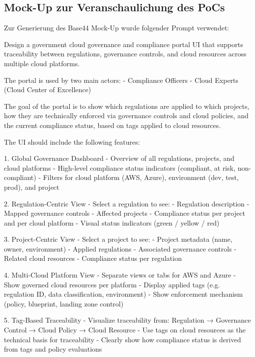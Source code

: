 \begin{appendix}

\section{Mock-Up zur Veranschaulichung des PoCs}
\label{appendix:ui-mockup}
Zur Generierung des Base44 Mock-Up wurde folgender Prompt verwendet:

Design a government cloud governance and compliance portal UI that supports traceability between regulations, governance controls, and cloud resources across multiple cloud platforms.

The portal is used by two main actors:
- Compliance Officers
- Cloud Experts (Cloud Center of Excellence)

The goal of the portal is to show which regulations are applied to which projects, how they are technically enforced via governance controls and cloud policies, and the current compliance status, based on tags applied to cloud resources.

The UI should include the following features:

1. Global Governance Dashboard
- Overview of all regulations, projects, and cloud platforms
- High-level compliance status indicators (compliant, at risk, non-compliant)
- Filters for cloud platform (AWS, Azure), environment (dev, test, prod), and project

2. Regulation-Centric View
- Select a regulation to see:
  - Regulation description
  - Mapped governance controls
  - Affected projects
  - Compliance status per project and per cloud platform
- Visual status indicators (green / yellow / red)

3. Project-Centric View
- Select a project to see:
  - Project metadata (name, owner, environment)
  - Applied regulations
  - Associated governance controls
  - Related cloud resources
- Compliance status per regulation

4. Multi-Cloud Platform View
- Separate views or tabs for AWS and Azure
- Show governed cloud resources per platform
- Display applied tags (e.g. regulation ID, data classification, environment)
- Show enforcement mechanism (policy, blueprint, landing zone control)

5. Tag-Based Traceability
- Visualize traceability from:
  Regulation → Governance Control → Cloud Policy → Cloud Resource
- Use tags on cloud resources as the technical basis for traceability
- Clearly show how compliance status is derived from tags and policy evaluations


\end{appendix}
